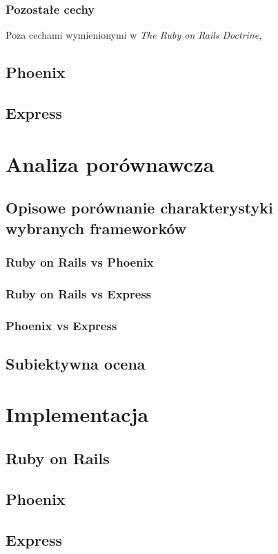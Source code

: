 \documentclass[mgr,oneside]{mgr}
\begin{document}
\subsection{Pozostałe cechy}
Poza cechami wymienionymi w \textit{The Ruby on Rails Doctrine}, 

\section{Phoenix} %
\section{Express}

\chapter{Analiza porównawcza}
\section{Opisowe porównanie charakterystyki wybranych frameworków}
\subsection{Ruby on Rails vs Phoenix}
\subsection{Ruby on Rails vs Express}
\subsection{Phoenix vs Express}
\section{Subiektywna ocena}

\chapter{Implementacja}
\section{Ruby on Rails}
\section{Phoenix}
\section{Express}
\end{document}
